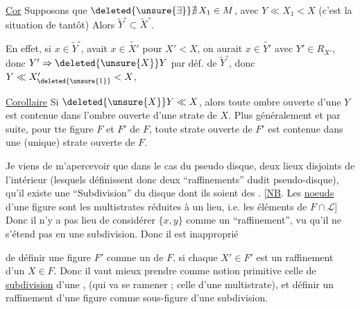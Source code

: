\uline{Cor}  Supposons que $\deleted{\unsure{\exists}}\nexists\,X_1\in M$, avec $Y\ll X_1<X$ (c'est la situation de tantôt) Alors $\widetilde Y^\circ\subset\widetilde X^\circ$.

En effet, si $x\in\widetilde Y^\circ$,  avait $x\in\widetilde{X'}$ pour $X'<X$, on aurait $x\in\widetilde{Y'}$ avec $Y'\in R_{X'}$, donc $Y'\Rightarrow\deleted{\unsure{X}}Y$ par déf. de $\widetilde Y^\circ$, donc $Y\ll X'_{\deleted{\unsure{1}}}<X$, 

\uline{Corollaire} Si $\deleted{\unsure{X}}Y\ll X$, alors  toute ombre ouverte d'une   $Y$ est contenue dans l'ombre ouverte d'une strate de $X$. Plus généralement et par suite, pour tte figure $F$ et    $F'$ de $F$, toute   strate ouverte de $F'$ est contenue dans une (unique) strate ouverte de $F$.

\enspace{}

Je viens de m'apercevoir que dans le cas du pseudo disque,  deux lieux disjoints   de l'intérieur (lesquels définissent donc deux ``raffinements'' dudit pseudo-disque), qu'il existe une ``Subdivision'' du disque dont ils soient des . [\uline{NB}. Les \uline{noeuds} d'une figure  sont les multistrates  réduites à un lieu, i.e. les éléments de $F\cap\mathcal L$] Donc  il n'y a pas lieu de considérer $\{x,y\}$ comme un ``raffinement'', vu qu'il ne s'étend pas en une subdivision. Donc il est inapproprié

de définir une figure $F'$ comme un \uline{} de $F$, si chaque $X'\in F'$  est un raffinement d'un $X\in F$. Donc il vaut mieux prendre comme notion primitive celle de \uline{subdivision} d'une  , (qui va se ramener ; celle d'une multistrate), et définir un raffinement d'une figure comme sous-figure d'une subdivision.

